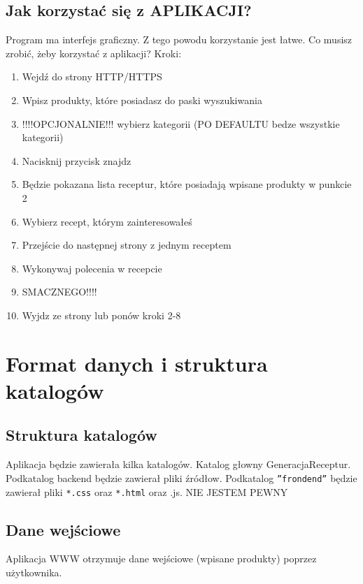 \documentclass[a4paper, 12pt]{article}
\begin{document}
 		\subsection{Jak korzystać się z APLIKACJI?}
 			\hspace*{1cm} Program ma interfejs graficzny. Z tego powodu korzystanie jest łatwe. Co musisz zrobić, żeby korzystać z aplikacji? \newline
            Kroki:
            \begin{enumerate}
                \item Wejdź do strony HTTP/HTTPS
                \item Wpisz produkty, które posiadasz  do paski wyszukiwania
                \item !!!!OPCJONALNIE!!! wybierz kategorii (PO DEFAULTU bedze wszystkie kategorii)
                \item Nacisknij przycisk znajdz
                \item Będzie pokazana lista receptur, które posiadają wpisane produkty w punkcie 2
                \item Wybierz recept, którym zainteresowałeś
                \item Przejście do następnej strony z jednym receptem
                \item Wykonywaj polecenia w recepcie
                \item SMACZNEGO!!!!
                \item Wyjdz ze strony lub ponów kroki 2-8
            \end{enumerate}
\newpage
	\section{Format danych i struktura katalogów} 
		\subsection{Struktura katalogów}
			\hspace*{1cm} Aplikacja będzie zawierała kilka katalogów.
			Katalog głowny GeneracjaReceptur.
			Podkatalog backend będzie zawierał pliki źródłow. Podkatalog \texttt{''frondend''} będzie zawierał pliki \texttt{*.css} oraz \texttt{*.html} oraz .js. NIE JESTEM PEWNY 
		
		\subsection{Dane wejściowe}
			\hspace*{1cm} Aplikacja WWW otrzymuje dane wejściowe (wpisane produkty) poprzez użytkownika. 
		
\end{document}
